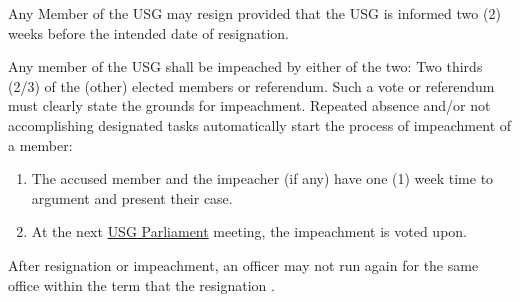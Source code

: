 {\protect\begin{parenum}
\item Any Member of the USG may resign provided that the USG is informed two (2) weeks before the intended date of resignation.

\item Any member of the USG shall be impeached by either of the two: Two thirds (2/3) of the (other) elected members or referendum. Such a vote or referendum must clearly state the grounds for impeachment. Repeated absence  and/or not accomplishing designated tasks automatically start the process of impeachment of a member:
\begin{enumerate}
\item The accused member and the impeacher (if any) have one (1) week time to argument and present their case.
\item At the next \hyperref[USGParliamentDef]{USG Parliament} meeting, the impeachment is voted upon.
\end{enumerate}

\item After resignation or impeachment, an officer may not run again for the same office within the term that the resignation .
\end{parenum}}
